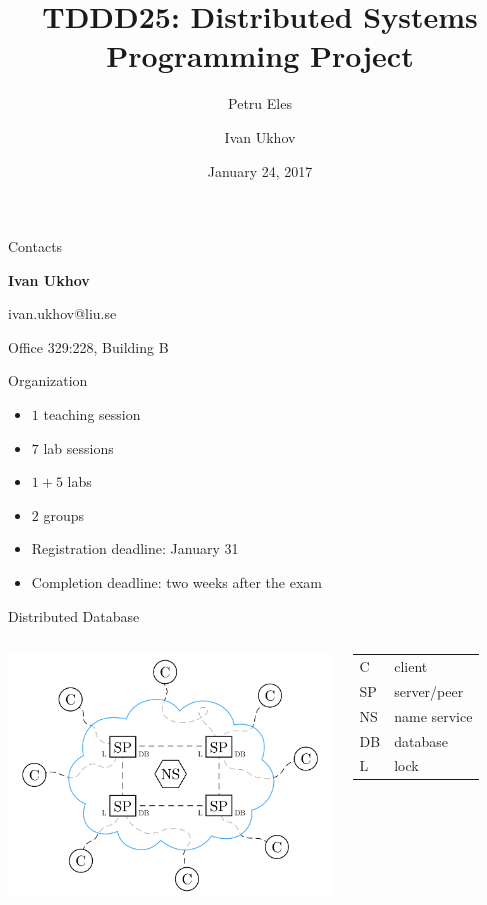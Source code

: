 \documentclass[compress,xcolor=table]{beamer}
\title{%
  TDDD25: Distributed Systems\\%
  \vspace{0.1em}%
  Programming Project%
}
\author{Petru Eles \and Ivan Ukhov}
\date{January 24, 2017}
\institute[Link\"oping University]{
  Computer and Information Science\\
  Link\"oping University
}
\begin{document}
\frame[plain]{\titlepage}

\begin{frame}{Contacts}
\begin{center}
  \textbf{Ivan Ukhov}
  \vspace{1em}

  ivan.ukhov@liu.se

  Office 329:228, Building B
\end{center}
\end{frame}

\begin{frame}{Organization}
\begin{itemize}
  \item $1$ teaching session
  \item $7$ lab sessions
  \item $1 + 5$ labs
  \item $2$ groups
  \item Registration deadline: January 31
  \item Completion deadline: two weeks after the exam
\end{itemize}
\end{frame}

\begin{frame}{Distributed Database}
\begin{columns}
  \column{7cm}
  \centering
  \includegraphics[scale=0.14,page=1]{include/assets/distributed-database}
  \column{3cm}
  \begin{tabular}{l @{ --- } l}
    \alert{C}  & client \\
    \alert{SP} & server/peer \\
    \alert{NS} & name service \\
    \alert{DB} & database \\
    \alert{L}  & lock
  \end{tabular}
\end{columns}
\end{frame}
\end{document}
